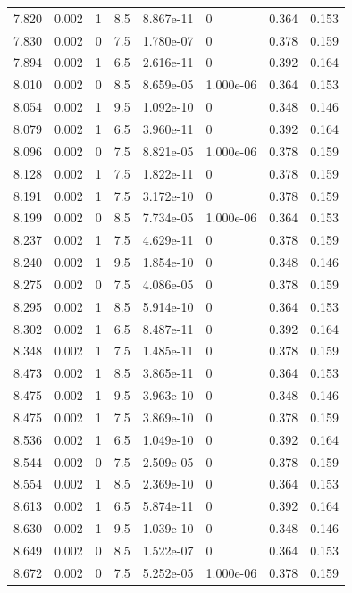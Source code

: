 \documentclass[preview]{standalone}
\begin{document}
{{{{{{\begin{tabular}{L{1.2cm}C{1.2cm} C{0.3cm}C{0.5cm} C{1.4cm}C{1.4cm} C{1.4cm}C{1.4cm}}
  7.820  &  0.002  & 1     & 8.5 &  8.867e-11  & 0  & 0.364 &  0.153   \\ 
  7.830  &  0.002  & 0     & 7.5 &  1.780e-07  & 0  & 0.378 &  0.159   \\ 
  7.894  &  0.002  & 1     & 6.5 &  2.616e-11  & 0  & 0.392 &  0.164   \\ 
  8.010  &  0.002  & 0     & 8.5 &  8.659e-05  & 1.000e-06  & 0.364 &  0.153   \\ 
  8.054  &  0.002  & 1     & 9.5 &  1.092e-10  & 0  & 0.348 &  0.146   \\ 
  8.079  &  0.002  & 1     & 6.5 &  3.960e-11  & 0  & 0.392 &  0.164   \\ 
  8.096  &  0.002  & 0     & 7.5 &  8.821e-05  & 1.000e-06  & 0.378 &  0.159   \\ 
  8.128  &  0.002  & 1     & 7.5 &  1.822e-11  & 0  & 0.378 &  0.159   \\ 
  8.191  &  0.002  & 1     & 7.5 &  3.172e-10  & 0  & 0.378 &  0.159   \\ 
  8.199  &  0.002  & 0     & 8.5 &  7.734e-05  & 1.000e-06  & 0.364 &  0.153   \\ 
  8.237  &  0.002  & 1     & 7.5 &  4.629e-11  & 0  & 0.378 &  0.159   \\ 
  8.240  &  0.002  & 1     & 9.5 &  1.854e-10  & 0  & 0.348 &  0.146   \\ 
  8.275  &  0.002  & 0     & 7.5 &  4.086e-05  & 0  & 0.378 &  0.159   \\ 
  8.295  &  0.002  & 1     & 8.5 &  5.914e-10  & 0  & 0.364 &  0.153   \\ 
  8.302  &  0.002  & 1     & 6.5 &  8.487e-11  & 0  & 0.392 &  0.164   \\ 
  8.348  &  0.002  & 1     & 7.5 &  1.485e-11  & 0  & 0.378 &  0.159   \\ 
  8.473  &  0.002  & 1     & 8.5 &  3.865e-11  & 0  & 0.364 &  0.153   \\ 
  8.475  &  0.002  & 1     & 9.5 &  3.963e-10  & 0  & 0.348 &  0.146   \\ 
  8.475  &  0.002  & 1     & 7.5 &  3.869e-10  & 0  & 0.378 &  0.159   \\ 
  8.536  &  0.002  & 1     & 6.5 &  1.049e-10  & 0  & 0.392 &  0.164   \\ 
  8.544  &  0.002  & 0     & 7.5 &  2.509e-05  & 0  & 0.378 &  0.159   \\ 
  8.554  &  0.002  & 1     & 8.5 &  2.369e-10  & 0  & 0.364 &  0.153   \\ 
  8.613  &  0.002  & 1     & 6.5 &  5.874e-11  & 0  & 0.392 &  0.164   \\ 
  8.630  &  0.002  & 1     & 9.5 &  1.039e-10  & 0  & 0.348 &  0.146   \\ 
  8.649  &  0.002  & 0     & 8.5 &  1.522e-07  & 0  & 0.364 &  0.153   \\ 
  8.672  &  0.002  & 0     & 7.5 &  5.252e-05  & 1.000e-06  & 0.378 &  0.159   \\ 
\hline 
\end{tabular} 

}}}}}}
\end{document}
